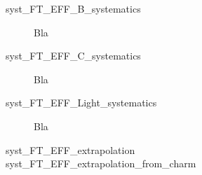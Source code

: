 \begin{description}
  \item[syst\_FT\_EFF\_B\_systematics] Bla
  \item[syst\_FT\_EFF\_C\_systematics] Bla
  \item[syst\_FT\_EFF\_Light\_systematics] Bla
  \item[syst\_FT\_EFF\_extrapolation]
  \item[syst\_FT\_EFF\_extrapolation\_from\_charm]
\end{description}
